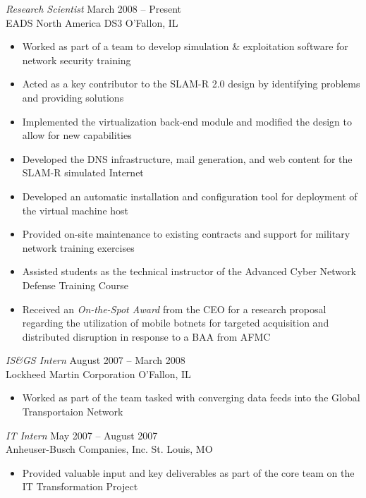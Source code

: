 \documentclass[margin,line]{resume}
\begin{document}
\begin{resume}
{\sl Research Scientist}            \hfill  March 2008 -- Present\\
EADS North America DS3              \hfill  O'Fallon, IL
\begin{itemize} \itemsep -2pt %
\small\item Worked as part of a team to develop simulation \& exploitation software for network security training
\small\item Acted as a key contributor to the SLAM-R 2.0 design by identifying problems and providing solutions
\small\item Implemented the virtualization back-end module and modified the design to allow for new capabilities
\small\item Developed the DNS infrastructure, mail generation, and web content for the SLAM-R simulated Internet
\small\item Developed an automatic installation and configuration tool for deployment of the virtual machine host 
\small\item Provided on-site maintenance to existing contracts and support for military network training exercises
\small\item Assisted students as the technical instructor of the Advanced Cyber Network Defense Training Course
\small\item Received an {\sl On-the-Spot Award} from the CEO for a research proposal regarding the utilization of
            mobile botnets for targeted acquisition and distributed disruption in response to a BAA from AFMC

\end{itemize}

{\sl IS\&GS Intern}                 \hfill  August 2007 -- March 2008\\
Lockheed Martin Corporation         \hfill  O'Fallon, IL
\begin{itemize} \itemsep -2pt %
\small\item Worked as part of the team tasked with converging data feeds into the Global Transportaion Network
\end{itemize}

{\sl IT Intern}                     \hfill  May 2007 -- August 2007\\
Anheuser-Busch Companies, Inc.      \hfill  St. Louis, MO
\begin{itemize} \itemsep -2pt %
\small\item Provided valuable input and key deliverables as part of the core team on the IT Transformation Project
\end{itemize}


\end{resume}
\end{document}
